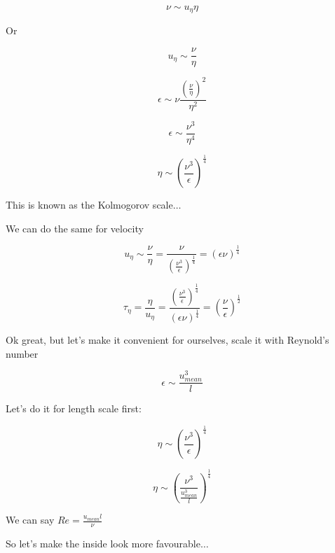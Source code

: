 \documentclass[12pt]{article}
\renewcommand{\_}{\kern-1.5pt\textunderscore\kern-1.5pt}
\begin{document}
\begin{itemize}
 \[  \nu  \sim u_{ \eta } \eta  \] \par

Or\par

 \[ u_{ \eta } \sim \frac{ \nu }{ \eta } \] \par


\vspace{\baselineskip}
 \[  \epsilon  \sim  \nu \frac{ \left( \frac{ \nu }{ \eta } \right) ^{2}}{ \eta ^{2}} \] \par

 \[  \epsilon  \sim \frac{ \nu ^{3}}{ \eta ^{4}} \] \par

 \[  \eta  \sim  \left( \frac{ \nu ^{3}}{ \epsilon } \right) ^{\frac{1}{4}} \] \par

This is known as the Kolmogorov scale$ \ldots $ \par

We can do the same for velocity\par

 \[ u_{ \eta } \sim \frac{ \nu }{ \eta }=\frac{ \nu }{ \left( \frac{ \nu ^{3}}{ \epsilon } \right) ^{\frac{1}{4}}}= \left(  \epsilon  \nu  \right) ^{\frac{1}{4}} \] \par

 \[  \tau_{ \eta }=\frac{ \eta }{u_{ \eta }}=\frac{ \left( \frac{ \nu ^{3}}{ \epsilon } \right) ^{\frac{1}{4}}}{ \left(  \epsilon  \nu  \right) ^{\frac{1}{4}}}= \left( \frac{ \nu }{ \epsilon } \right) ^{\frac{1}{2}} \] \par

Ok great, but let’s make it convenient for ourselves, scale it with Reynold’s number\par

 \[  \epsilon  \sim \frac{u_{mean}^{3}}{l} \] \par

Let’s do it for length scale first:\par

 \[  \eta  \sim  \left( \frac{ \nu ^{3}}{ \epsilon } \right) ^{\frac{1}{4}} \] \par

 \[  \eta  \sim  \left( \frac{ \nu ^{3}}{\frac{u_{mean}^{3}}{l}} \right) ^{\frac{1}{4}} \] \par

We can say  \( Re=\frac{u_{mean}l}{ \nu } \) \par


\vspace{\baselineskip}
So let’s make the inside look more favourable$ \ldots $ \par


\end{itemize}
\end{document}
